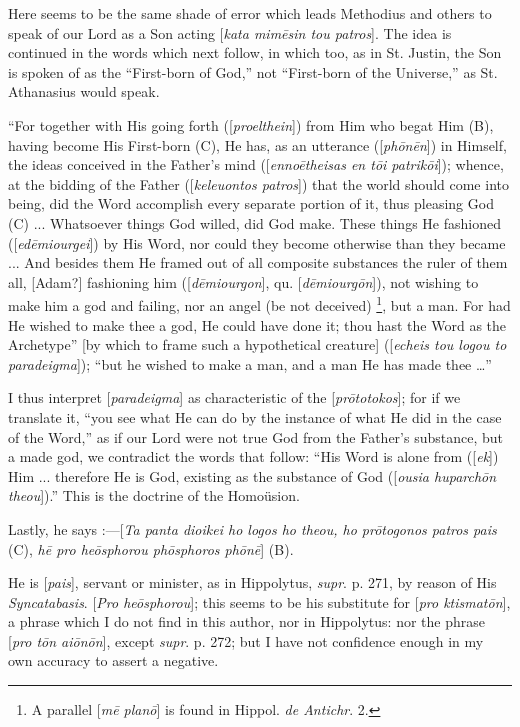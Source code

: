 Here seems to be the same shade of error which leads Methodius and
others to speak of our Lord as a Son acting [\emph{kata mim\={e}sin
tou patros}]. The idea is continued in the words which next follow,
in which too, as in St. Justin, the Son is spoken of as the
``First-born of God,'' not ``First-born of the
Universe,'' as St. Athanasius would speak.

``For together with His going forth ([\emph{proelthein}]) from
Him who begat Him (B), having become His First-born (C), He has, as an
utterance ([\emph{ph\={o}n\={e}n}]) in Himself, the ideas conceived in
the Father's mind ([\emph{enno\={e}theisas en t\={o}i patrik\={o}i}]);
whence, at the bidding of the Father ([\emph{keleuontos patros}]) that
the world should come into being, did the Word accomplish every
separate portion of it, thus pleasing God (C) ... Whatsoever things
God willed, did God make. These things He fashioned ([\emph{ed\={e}miourgei}])
by His Word, nor could they become otherwise than they became ... And
besides them He framed out of all composite substances the ruler of
them all, [Adam?] fashioning him ([\emph{d\={e}miourgon}], qu. [\emph{d\={e}miourg\={o}n}]),
not wishing to make him a god and failing, nor an angel (be not
deceived) \footnote{A parallel [\emph{m\={e}
plan\={o}}] is found in Hippol. \emph{de Antichr}. 2.}, but a man. For
had He wished to make thee a god, He could have done it; thou hast the
Word as the Archetype'' [by which to frame such a
hypothetical creature] ([\emph{echeis tou logou to paradeigma}]);
``but he wished to make a man, and a man He has made thee …''

I thus interpret [\emph{paradeigma}] as characteristic of the [\emph{pr\={o}totokos}];
for if we translate it, ``you see what He can do by the instance
of what He did in the case of the Word,'' as if our Lord were not
true God from the Father's substance, but a made god, we contradict
the words that follow: ``His Word is alone from ([\emph{ek}]) Him
... therefore He is God, existing as the substance of God ([\emph{ousia
huparch\={o}n theou}]).'' This is the doctrine of the
Homoüsion.

Lastly, he says :—[\emph{Ta panta dioikei ho logos ho theou, ho pr\={o}togonos
patros pais} (C), \emph{h\={e} pro he\={o}sphorou ph\={o}sphoros
ph\={o}n\={e}}] (B).

He is [\emph{pais}], servant or minister, as in Hippolytus, \emph{supr}.
p. 271, by reason of His \emph{Syncatabasis}. [\emph{Pro he\={o}sphorou}];
this seems to be his substitute for [\emph{pro ktismat\={o}n}], a
phrase which I do not find in this author, nor in Hippolytus: nor the
phrase [\emph{pro t\={o}n ai\={o}n\={o}n}], except \emph{supr}.
p. 272; but I have not confidence enough in my own accuracy to assert
a negative.


